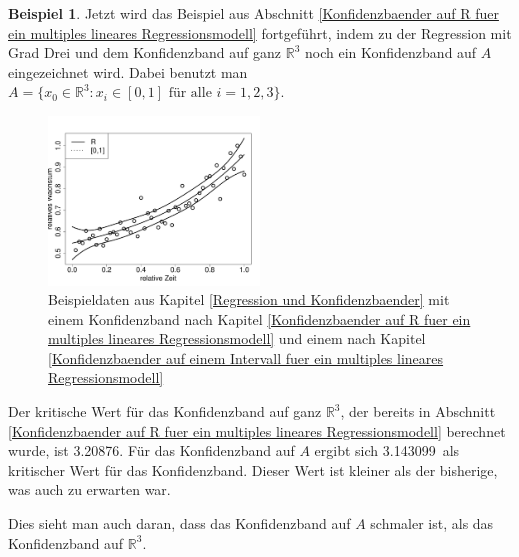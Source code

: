 \documentclass[12pt,a4paper]{article}
\theoremstyle{definition}
\newtheorem{Beispiel}[Definition]{Beispiel}
\theoremstyle{definition}
\theoremstyle{definition}
\theoremstyle{definition}
\newcommand{\cR}{3.20876}
\newcommand{\cA}{3.143099}
\begin{document}
\begin{Beispiel}
Jetzt wird das Beispiel aus Abschnitt \ref{Konfidenzbaender auf R fuer ein multiples lineares Regressionsmodell} fortgeführt, indem zu der Regression mit Grad Drei und dem Konfidenzband auf ganz $\mathbb{R}^{3}$ noch ein Konfidenzband auf $A$ eingezeichnet wird. Dabei benutzt man $A = \{x_{0} \in \mathbb{R}^3 : x_i \in [0,1] \text{ für alle } i=1, 2, 3 \} $. 


\begin{figure}[H] 
  \centering
     \includegraphics[width=0.5\textwidth]{Bsp-KB-minmax}
  \caption{Beispieldaten aus Kapitel \ref{Regression und Konfidenzbaender} mit einem Konfidenzband nach Kapitel \ref{Konfidenzbaender auf R fuer ein multiples lineares Regressionsmodell} und einem nach Kapitel \ref{Konfidenzbaender auf einem Intervall fuer ein multiples lineares Regressionsmodell}}
  \label{KB-minmax-BSP}
\end{figure}

Der kritische Wert für das Konfidenzband auf ganz $\mathbb{R}^3$, der bereits in Abschnitt \ref{Konfidenzbaender auf R fuer ein multiples lineares Regressionsmodell} berechnet wurde, ist \cR . Für das Konfidenzband auf $A$ ergibt sich \cA ~als kritischer Wert für das Konfidenzband. Dieser Wert ist kleiner als der bisherige, was auch zu erwarten war.

Dies sieht man auch daran, dass das Konfidenzband auf $A$ schmaler ist, als das Konfidenzband auf $\mathbb{R}^3$. 
\end{Beispiel}
\end{document}
